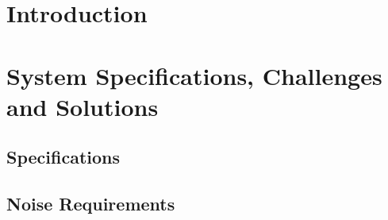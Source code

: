 \documentclass[12pt,letterpaper]{memoir}
\numberwithin{equation}{chapter}
\numberwithin{figure}{chapter}
\numberwithin{table}{chapter}
\begin{document}
\newpage

\tableofcontents* %

\newpage
\listoftables

\newpage
\listoffigures

\mainmatter

%

\chapter{Introduction}\label{c:specs}

\chapter{System Specifications, Challenges and Solutions}\label{c:specs}

\section{Specifications} \label{sec:ch2-specifications}

\section{Noise Requirements} \label{sec:ch2-noise}











\SingleSpacing
\printbibliography
\end{document}
